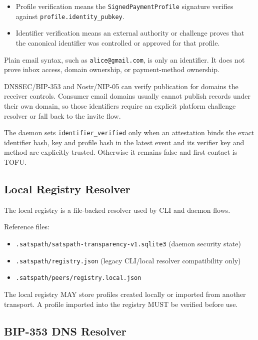 \documentclass[
]{article}
\providecommand{\tightlist}{%
  \setlength{\itemsep}{0pt}\setlength{\parskip}{0pt}}
\begin{document}
\begin{itemize}
\tightlist
\item
  Profile verification means the \texttt{SignedPaymentProfile} signature
  verifies against \texttt{profile.identity\_pubkey}.
\item
  Identifier verification means an external authority or challenge
  proves that the canonical identifier was controlled or approved for
  that profile.
\end{itemize}

Plain email syntax, such as \texttt{alice@gmail.com}, is only an
identifier. It does not prove inbox access, domain ownership, or
payment-method ownership.

DNSSEC/BIP-353 and Nostr/NIP-05 can verify publication for domains the
receiver controls. Consumer email domains usually cannot publish records
under their own domain, so those identifiers require an explicit
platform challenge resolver or fall back to the invite flow.

The daemon sets \texttt{identifier\_verified} only when an attestation
binds the exact identifier hash, key and profile hash in the latest
event and its verifier key and method are explicitly trusted. Otherwise
it remains false and first contact is TOFU.

\hypertarget{local-registry-resolver}{%
\subsection{Local Registry Resolver}\label{local-registry-resolver}}

The local registry is a file-backed resolver used by CLI and daemon
flows.

Reference files:

\begin{itemize}
\tightlist
\item
  \texttt{.satspath/satspath-transparency-v1.sqlite3} (daemon security
  state)
\item
  \texttt{.satspath/registry.json} (legacy CLI/local resolver
  compatibility only)
\item
  \texttt{.satspath/peers/registry.local.json}
\end{itemize}

The local registry MAY store profiles created locally or imported from
another transport. A profile imported into the registry MUST be verified
before use.

\hypertarget{bip-353-dns-resolver}{%
\subsection{BIP-353 DNS Resolver}\label{bip-353-dns-resolver}}
\end{document}
